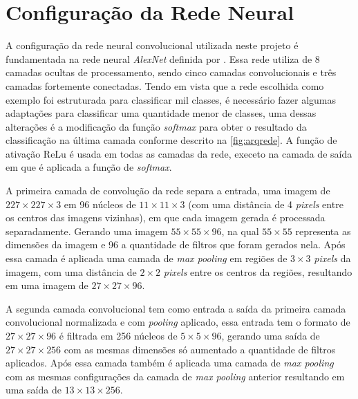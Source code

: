 


\section{Configuração da Rede Neural}

A configuração da rede neural convolucional utilizada neste projeto é fundamentada na rede neural \textit{AlexNet} definida por . Essa rede utiliza de 8 camadas ocultas de processamento, sendo cinco camadas convolucionais e três camadas fortemente conectadas. Tendo em vista que a rede escolhida como exemplo foi estruturada para classificar mil classes, é necessário fazer algumas adaptações para classificar uma quantidade menor de classes, uma dessas alterações é a modificação da função \textit{softmax} para obter o resultado da classificação na última camada conforme descrito na \autoref{fig:arqrede}. A função de ativação ReLu é usada em todas as camadas da rede, execeto na camada de saída em que é aplicada a função de \textit{softmax}.

\par A primeira camada de convolução da rede separa a entrada, uma imagem de $227\times227\times3$ em 96 núcleos de $11\times11\times3$ (com uma distância de 4 \textit{pixels} entre os centros das imagens vizinhas), em que cada imagem gerada é processada separadamente. 
Gerando uma imagem $55\times55\times96$, na qual $55\times55$ representa as dimensões da imagem e 96 a quantidade de filtros que foram gerados nela. Após essa camada é aplicada uma camada de \textit{max pooling} em regiões de $3\times3$ \textit{pixels} da imagem, com uma distância de $2\times2$ \textit{pixels} entre os centros da regiões, resultando em uma imagem de $27\times27\times96$.

\par A segunda camada convolucional tem como entrada a saída da primeira camada convolucional normalizada e com \textit{pooling} aplicado, essa entrada tem o formato de $27\times27\times96$ é filtrada em 256 núcleos de $5\times5\times96$, gerando uma saída de $27\times27\times256$ com as mesmas dimensões só aumentado a quantidade de filtros aplicados. Após essa camada também é aplicada uma camada de \textit{max pooling} com as mesmas configurações da camada de \textit{max pooling} anterior resultando em uma saída de $13\times13\times256$.

